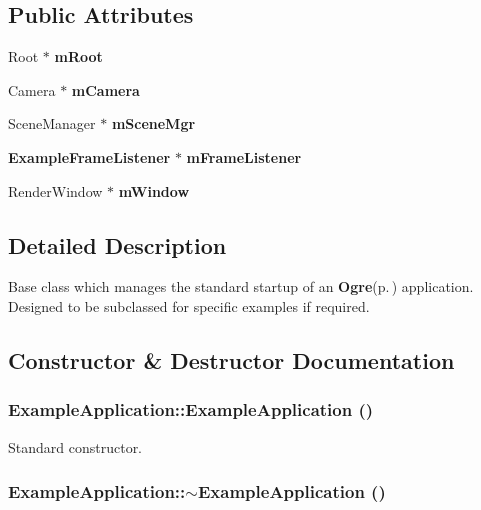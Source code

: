 \subsection*{Public Attributes}
\begin{CompactItemize}
\item 
Root $\ast$ {\bf m\-Root}
\item 
Camera $\ast$ {\bf m\-Camera}
\item 
Scene\-Manager $\ast$ {\bf m\-Scene\-Mgr}
\item 
{\bf Example\-Frame\-Listener} $\ast$ {\bf m\-Frame\-Listener}
\item 
Render\-Window $\ast$ {\bf m\-Window}
\end{CompactItemize}


\subsection{Detailed Description}
Base class which manages the standard startup of an {\bf Ogre}{\rm (p.\,\pageref{namespaceOgre})} application. Designed to be subclassed for specific examples if required. 



\subsection{Constructor \& Destructor Documentation}
\subsubsection{\setlength{\rightskip}{0pt plus 5cm}Example\-Application::Example\-Application ()\hspace{0.3cm}{\tt  [inline]}}\label{classExampleApplication_a0}


Standard constructor. 

\subsubsection{\setlength{\rightskip}{0pt plus 5cm}Example\-Application::$\sim${\bf Example\-Application} ()\hspace{0.3cm}{\tt  [inline]}}\label{classExampleApplication_a2}


